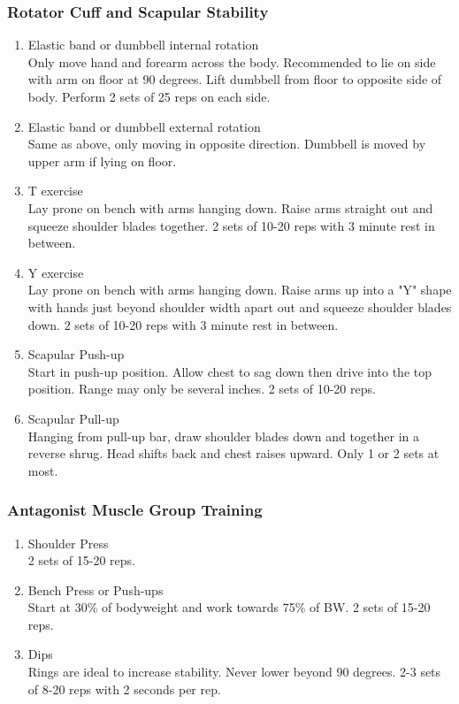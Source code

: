 \documentclass[12pt, letterpaper]{article}
\begin{document}
\subsubsection{Rotator Cuff and Scapular Stability}

\begin{enumerate}
    \item Elastic band or dumbbell internal rotation \\ Only move hand and forearm across the body. Recommended to lie on side with arm on floor at 90 degrees. Lift dumbbell from floor to opposite side of body. Perform 2 sets of 25 reps on each side.
    \item Elastic band or dumbbell external rotation \\ Same as above, only moving in opposite direction. Dumbbell is moved by upper arm if lying on floor.
    \item T exercise \\ Lay prone on bench with arms hanging down. Raise arms straight out and squeeze shoulder blades together. 2 sets of 10-20 reps with 3 minute rest in between.
    \item Y exercise \\ Lay prone on bench with arms hanging down. Raise arms up into a "Y" shape with hands just beyond shoulder width apart out and squeeze shoulder blades down. 2 sets of 10-20 reps with 3 minute rest in between.
    \item Scapular Push-up \\ Start in push-up position. Allow chest to sag down then drive into the top position. Range may only be several inches. 2 sets of 10-20 reps.
    \item Scapular Pull-up \\ Hanging from pull-up bar, draw shoulder blades down and together in a reverse shrug. Head shifts back and chest raises upward. Only 1 or 2 sets at most.
\end{enumerate}

\subsubsection{Antagonist Muscle Group Training}

\begin{enumerate}
    \item Shoulder Press \\ 2 sets of 15-20 reps.
    \item Bench Press or Push-ups \\ Start at 30\% of bodyweight and work towards 75\% of BW. 2 sets of 15-20 reps.
    \item Dips \\ Rings are ideal to increase stability. Never lower beyond 90 degrees. 2-3 sets of 8-20 reps with 2 seconds per rep.
\end{enumerate}
    
\end{document}
